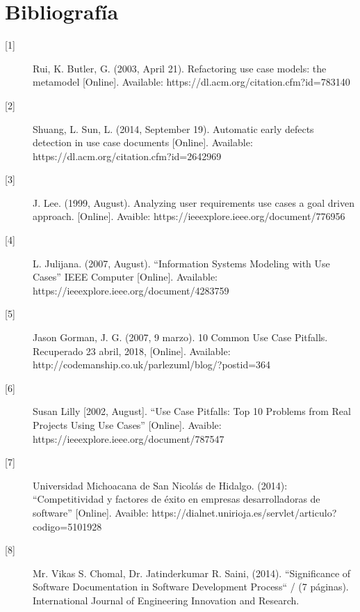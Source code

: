 \chapter{Bibliografía}

\begin{description}
	
		\item[\hypertarget{b01}{[1]}] Rui, K. Butler, G. (2003, April 21). Refactoring use case models: the metamodel [Online]. Available: https://dl.acm.org/citation.cfm?id=783140
		
		\item[\hypertarget{b02}{[2]}] Shuang, L. Sun, L. (2014, September 19). Automatic early defects detection in use case documents [Online]. Available: https://dl.acm.org/citation.cfm?id=2642969
		
		\item[\hypertarget{b03}{[3]}] 
		J. Lee. (1999, August). Analyzing user requirements use cases a goal driven approach. [Online]. Avaible: https://ieeexplore.ieee.org/document/776956
		
		\item[\hypertarget{b04}{[4]}]  L. Julijana. (2007, August). “Information Systems Modeling with Use Cases” IEEE Computer [Online]. Available:
		https://ieeexplore.ieee.org/document/4283759
		
		\item[\hypertarget{b05}{[5]}] Jason Gorman, J. G. (2007, 9 marzo). 10 Common Use Case Pitfalls. Recuperado 23 abril, 2018,  [Online]. Available: http://codemanship.co.uk/parlezuml/blog/?postid=364
		
		\item[\hypertarget{b06}{[6]}] Susan Lilly [2002, August]. “Use Case Pitfalls: Top 10 Problems from Real Projects Using Use Cases” [Online]. Avaible: https://ieeexplore.ieee.org/document/787547
		
		\item[\hypertarget{b07}{[7]}] Universidad Michoacana de San Nicolás de Hidalgo. (2014): “Competitividad y factores de éxito en empresas desarrolladoras de software” [Online]. Avaible: https://dialnet.unirioja.es/servlet/articulo?codigo=5101928
		
		\item[\hypertarget{b08}{[8]}] Mr. Vikas S. Chomal, Dr. Jatinderkumar R. Saini, (2014). “Significance of Software Documentation in Software
		Development Process“
 / (7 páginas). International Journal of Engineering Innovation and Research. 
		

\end{description}
